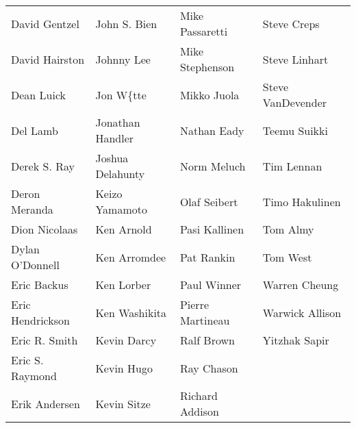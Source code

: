 \begin{center}
\begin{tabular}{llll}
David Gentzel & John S. Bien & Mike Passaretti & Steve Creps\\
David Hairston & Johnny Lee & Mike Stephenson & Steve Linhart\\
Dean Luick & Jon W\{tte & Mikko Juola & Steve VanDevender\\
Del Lamb & Jonathan Handler & Nathan Eady & Teemu Suikki\\
Derek S. Ray & Joshua Delahunty & Norm Meluch & Tim Lennan\\
Deron Meranda & Keizo Yamamoto & Olaf Seibert & Timo Hakulinen\\
Dion Nicolaas & Ken Arnold & Pasi Kallinen & Tom Almy\\
Dylan O'Donnell & Ken Arromdee & Pat Rankin & Tom West\\
Eric Backus & Ken Lorber & Paul Winner & Warren Cheung\\
Eric Hendrickson & Ken Washikita & Pierre Martineau & Warwick Allison\\
Eric R. Smith & Kevin Darcy & Ralf Brown & Yitzhak Sapir\\
Eric S. Raymond & Kevin Hugo & Ray Chason\\
Erik Andersen & Kevin Sitze & Richard Addison
\end{tabular}
\end{center}
\clearpage



